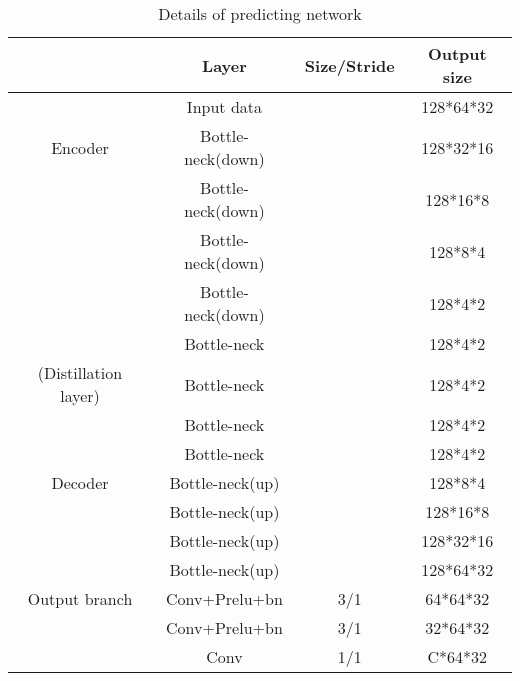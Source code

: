 \documentclass[journal]{IEEEtran}
\begin{document}
\begin{table}[ht]
    \caption{Details of predicting network}
    \begin{center}
        \begin{tabular}{|c|c|c|c|}
            \hline
            & \textbf{Layer} & \textbf{Size/Stride} & \textbf{Output size}\\
            \hline
            \hline
            & Input data &  & 128*64*32\\
            \hline
            \hline
            Encoder & Bottle-neck(down) &  & 128*32*16\\
            & Bottle-neck(down) &  & 128*16*8\\
            & Bottle-neck(down) &  & 128*8*4\\
            & Bottle-neck(down) &  & 128*4*2\\
            & Bottle-neck &  & 128*4*2\\
            (Distillation layer)& Bottle-neck &  & 128*4*2\\
            & Bottle-neck &  & 128*4*2\\
            & Bottle-neck &  & 128*4*2\\
            \hline
            \hline
            Decoder & Bottle-neck(up) &  & 128*8*4\\
            & Bottle-neck(up) &  & 128*16*8\\
            & Bottle-neck(up) &  & 128*32*16\\
            & Bottle-neck(up) &  & 128*64*32\\
            \hline
            \hline
            Output branch & Conv+Prelu+bn & 3/1 & 64*64*32\\
            & Conv+Prelu+bn & 3/1 & 32*64*32\\
            & Conv & 1/1 & C*64*32\\
            \hline
        \end{tabular}
    \end{center}
\end{table}
 
\end{document}
